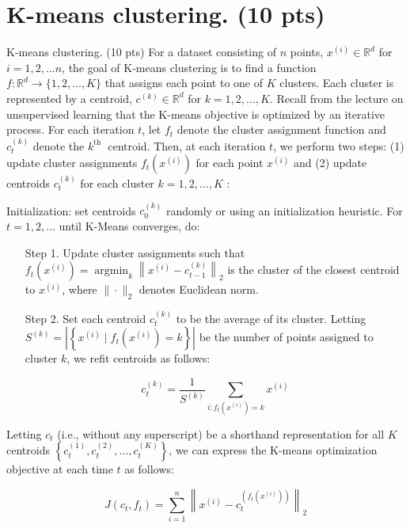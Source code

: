 \documentclass[10pt, a4paper]{article}
\begin{document}
\setcounter{section}{0}

\section{K-means clustering. (10 pts)}
\setcounter{Problem}{0}
K-means clustering. (10 pts) For a dataset consisting of $n$ points, $x^{(i)} \in \mathbb{R}^{d}$ for $i=1,2, \ldots n$, the goal of K-means clustering is to find a function $f: \mathbb{R}^{d} \rightarrow\{1,2, \ldots, K\}$ that assigns each point to one of $K$ clusters. Each cluster is represented by a centroid, $c^{(k)} \in \mathbb{R}^{d}$ for $k=1,2, \ldots, K$. Recall from the lecture on unsupervised learning that the K-means objective is optimized by an iterative process. For each iteration $t$, let $f_{t}$ denote the cluster assignment function and $c_{t}^{(k)}$ denote the $k^{\text {th }}$ centroid. Then, at each iteration $t$, we perform two steps: (1) update cluster assignments $f_{t}\left(x^{(i)}\right)$ for each point $x^{(i)}$ and (2) update centroids $c_{t}^{(k)}$ for each cluster $k=1,2, \ldots, K$ :

Initialization: set centroids $c_{0}^{(k)}$ randomly or using an initialization heuristic. For $t=1,2, \ldots$ until K-Means converges, do:

\begin{enumerate}
    \item[Step 1.] Update cluster assignments such that $f_{t}\left(x^{(i)}\right)=\operatorname{argmin}_{k}\left\|x^{(i)}-c_{t-1}^{(k)}\right\|_{2}$ is the cluster of the closest centroid to $x^{(i)}$, where $\|\cdot\|_{2}$ denotes Euclidean norm.

    \item[Step 2.] Set each centroid $c_{t}^{(k)}$ to be the average of its cluster. Letting $S^{(k)}=\left|\left\{x^{(i)} \mid f_{t}\left(x^{(i)}\right)=k\right\}\right|$ be the number of points assigned to cluster $k$, we refit centroids as follows:

$$
c_{t}^{(k)}=\frac{1}{S^{(k)}} \sum_{i: f_{t}\left(x^{(i)}\right)=k} x^{(i)}
$$
\end{enumerate}

Letting $c_{t}$ (i.e., without any superscript) be a shorthand representation for all $K$ centroids $\left\{c_{t}^{(1)}, c_{t}^{(2)}, \ldots, c_{t}^{(K)}\right\}$, we can express the K-means optimization objective at each time $t$ as follows:

$$
J\left(c_{t}, f_{t}\right)=\sum_{i=1}^{n}\left\|x^{(i)}-c_{t}^{\left(f_{t}\left(x^{(i)}\right)\right)}\right\|_{2}
$$
\end{document}
